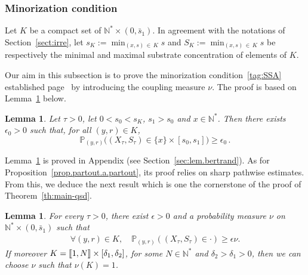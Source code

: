\documentclass[10pt]{amsart}
\newtheorem{lemm}[theo]{Lemma}\newtheorem{prop}[theo]{Proposition}\newtheorem{coro}[theo]{Corollary}\newtheorem{conj}[theo]{Conjecture}
\theoremstyle{definition}\newtheorem{defi}[theo]{Definition}\newtheorem{rema}[theo]{Remark}\newtheorem{exam}[theo]{Example}\newtheorem{exem}[theo]{Example}\newtheorem{nota}[theo]{Notation}
\newcommand{\llbracket}{\mathopen{[\mkern -2.7mu[}}
\newcommand{\rrbracket}{\mathclose{]\mkern -2.7mu]}}
\newcommand{\PP}{\mathbb{P}}
\newcommand{\NN}{\mathbb{N}}
\newcommand{\1}{\mathbf{1}}
\let\oldforall\forall
\renewcommand*{\forall}{\mathrel{\oldforall}}
\begin{document}
\subsubsection{Minorization condition}\label{sec:small.set}


Let $K$ be a compact set of $\NN^*\times (0,\bar s_1)$. In agreement with the notations of Section~\ref{sect:irre}, let $s_K:=\min_{(x,s)\,\in\,K}s$ and $S_K:=\min_{(x,s)\,\in\,K}s$ be respectively the minimal and maximal substrate concentration of elements of $K$.

Our aim in this subsection is to prove the minorization condition~\eqref{tag:SSA} established page~\pageref{tag:SSA} by introducing the coupling measure $\nu$. The proof is based on Lemma~\ref{lem:bertrand} below.

\begin{lemm}\label{lem:bertrand}
Let $\tau>0$, let $0<s_0<s_K$, $s_1>s_0$ and $x\in \NN^*$. Then there exists $\epsilon_0>0$ such that, for all $(y,r)\in K$,
\[
\PP_{(y,r)}\big((X_{\tau},S_{\tau})\in \{x\}\times [s_0,s_1]\big) \geq \epsilon_0\,.
\]
\end{lemm}

Lemma~\ref{lem:bertrand} is proved in Appendix (see Section~\ref{sec:lem.bertrand}). As for Proposition~\ref{prop.partout.a.partout}, its proof relies on sharp pathwise estimates. From this, we deduce the next result which is one the cornerstone of the proof of Theorem~\ref{th:main-qsd}.

\begin{lemm}\label{lem:smallset}
For every $\tau>0$, there exist $\epsilon>0$ and a probability measure $\nu$ on $\NN^*\times (0,\bar s_1)$ such that
\begin{align}\label{eq:smallset}
\forall (y,r) \in K, \quad \PP_{(y,r)}\left((X_\tau, S_\tau) \in \cdot \right)\geq \epsilon \nu.
\end{align}
If moreover $K = \llbracket 1, N \rrbracket \times [\delta_1, \delta_2]$, for some $N \in \NN^*$ and $\delta_2>\delta_1>0$, then we can choose $\nu$ such that $\nu(K)=1$.
\end{lemm}
\end{document}
